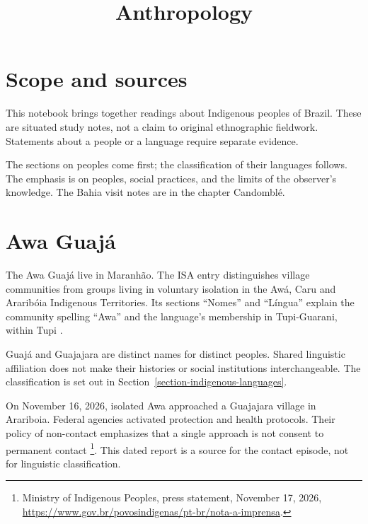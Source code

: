 



\title{Anthropology}
\maketitle

\label{section-phantom}

\tableofcontents

\section{Scope and sources}
\label{section-anthropology-scope}

This notebook brings together readings about
Indigenous peoples of Brazil. These are
situated study notes, not a claim to
original ethnographic fieldwork. Statements
about a people or a language require
separate evidence.

The sections on peoples come first; the
classification of their languages follows.
The emphasis is on peoples, social
practices, and the limits of the
observer's knowledge. The
Bahia visit notes are in the chapter
Candombl\'e.

\section{Awa Guajá}
\label{section-awa-guaja}

The Awa Guajá live in Maranhão. The ISA
entry distinguishes village communities
from groups living in voluntary isolation
in the Awá, Caru and Araribóia Indigenous
Territories. Its sections ``Nomes'' and
``Língua'' explain the community spelling
``Awa'' and the language's membership in
Tupi-Guarani, within Tupi
\cite{isa-awa-guaja}.

Guajá and Guajajara are distinct names
for distinct peoples. Shared linguistic
affiliation does not make their histories
or social institutions interchangeable.
The classification is set out in
Section~\ref{section-indigenous-languages}.

On November 16, 2026, isolated Awa
approached a Guajajara village in
Arariboia. Federal agencies activated
protection and health protocols. Their
policy of non-contact emphasizes that
a single approach is not consent to
permanent contact
\footnote{Ministry of Indigenous Peoples,
press statement, November 17, 2026,
\url{https://www.gov.br/povosindigenas/pt-br/nota-a-imprensa}.}.
This dated report is a source for the
contact episode, not for linguistic
classification.


